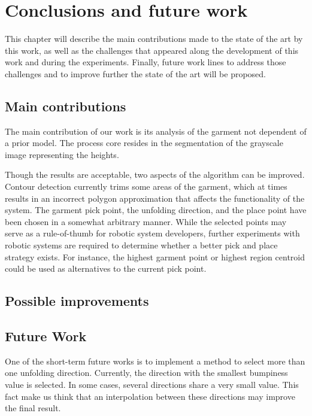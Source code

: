 \chapter{Conclusions and future work}
\label{conclusions_and_future_work}

This chapter will describe the main contributions made to the state of the art by this work, as well as the challenges that appeared along the development of this work and during the experiments. Finally, future work lines to address those challenges and to improve further the state of the art will be proposed.

 
 
\section {Main contributions}
\label{conclusions:contributions}

The main contribution of our work is its analysis of the garment not dependent of a prior model. The process core resides in the segmentation of the grayscale image representing the heights.

Though the results are acceptable, two aspects of the algorithm can be improved.
Contour detection currently trims some areas of the garment, which at times results in an incorrect polygon approximation that affects the functionality of the system.
The garment pick point, the unfolding direction, and the place point have been chosen in a somewhat arbitrary manner. While the selected points may serve as a rule-of-thumb for robotic system developers, further experiments with robotic systems are required to determine whether a better pick and place strategy exists. For instance, the highest garment point or highest region centroid could be used as alternatives to the current pick point.

\section {Possible improvements}
\label{conclusions:improvements}

\section{Future Work}
\label{conclusions:future_work}
One of the short-term future works is to implement a method to select more than one unfolding direction. Currently, the direction with the smallest bumpiness value is selected. In some cases, several directions share a very small value. This fact make us think that an interpolation between these directions may improve the final result. 